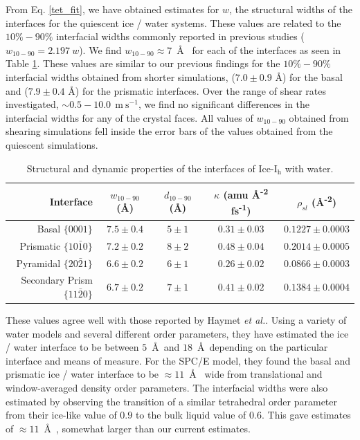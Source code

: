 \documentclass[journal = jpccck, manuscript = article]{achemso}
\begin{document}
From Eq. \eqref{tet_fit}, we have obtained estimates for $w$, the
structural widths of the interfaces for the quiescent ice / water
systems. These values are related to the $10\%-90\%$ interfacial
widths commonly reported in previous studies
($w_\mathrm{10-90} = 2.197~w$).\cite{Bryk2002,Bryk2004} We find
$w_\mathrm{10-90} \approx 7$~\AA~ for each of the interfaces as seen
in Table \ref{tab:kappa}.  These values are similar to our previous
findings for the $10\%-90\%$ interfacial widths obtained from shorter
simulations, ($7.0 \pm 0.9$ \AA) for the basal and ($7.9 \pm 0.4$ \AA)
for the prismatic interfaces.\cite{Louden2013} Over the range of shear
rates investigated, $\sim 0.5-10.0~\mathrm{~m~s}^{-1}$, we find no
significant differences in the interfacial widths for any of the
crystal faces. All values of $w_\mathrm{10-90}$ obtained from shearing
simulations fell inside the error bars of the values obtained from the
quiescent simulations.

\begin{table}[h]
\centering
\caption{Structural and dynamic properties of the interfaces of
  Ice-I$_\mathrm{h}$ with water.\label{tab:kappa}}
\begin{tabular}{r|cccc}  
\toprule
Interface & $w_\mathrm{10-90}$ (\AA) &  $d_\mathrm{10-90}$ (\AA) & $\kappa$ (amu \AA\textsuperscript{-2} fs\textsuperscript{-1}) & $\rho_{sl}$ (\AA\textsuperscript{-2}) \\ 
\midrule
Basal  $\{0001\}$                 & $7.5 \pm 0.4$ & $5 \pm 1$ &  $0.31 \pm 0.03$  & $0.1227 \pm 0.0003$  \\
Prismatic  $\{10\bar{1}0\}$       & $7.2 \pm 0.2$ & $8 \pm 2$  &  $0.48 \pm 0.04$  & $0.2014 \pm 0.0005$  \\
Pyramidal  $\{20\bar{2}1\}$       & $6.6 \pm 0.2$ & $6 \pm 1$ &  $0.26 \pm 0.02$  & $0.0866 \pm 0.0003$  \\
Secondary Prism  $\{11\bar{2}0\}$ & $6.7 \pm 0.2$ & $7 \pm 1$ &  $0.41 \pm 0.02$  & $0.1384 \pm 0.0004$  \\ 
\bottomrule
\end{tabular}
\end{table}

These values agree well with those reported by Haymet \textit{et
  al.}.\cite{Karim1988,Karim1990,Hayward2001,Bryk2002,Hayward2002,Bryk2004}
Using a variety of water models and several different order
parameters, they have estimated the ice / water interface to be
between $5$~\AA~and $18$~\AA~depending on the particular interface and
means of measure.  For the SPC/E model, they found the basal and
prismatic ice / water interface to be $\approx 11$~\AA~ wide from
translational and window-averaged density order parameters. The
interfacial widths were also estimated by observing the transition of
a similar tetrahedral order parameter from their ice-like value of
$0.9$ to the bulk liquid value of $0.6$. This gave estimates of
$\approx 11$~\AA~, somewhat larger than our current estimates.
\end{document}
